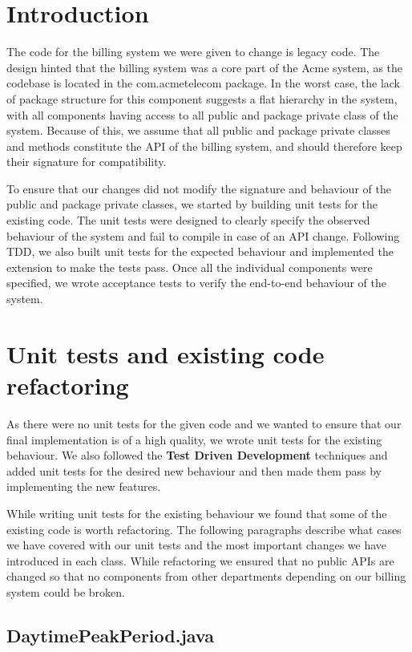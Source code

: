 \documentclass[a4paper]{article}
\begin{document}
\section{Introduction}
The code for the billing system we were given to change is legacy code. The design hinted that the billing system was a core part of the Acme system, as the codebase is located in the com.acmetelecom package. In the worst case, the lack of package structure for this component suggests a flat hierarchy in the system, with all components having access to all public and package private class of the system. Because of this, we assume that all public and package private classes and methods constitute the API of the billing system, and should therefore keep their signature for compatibility.

To ensure that our changes did not modify the signature and behaviour of the public and package private classes, we started by building unit tests for the existing code. The unit tests were designed to clearly specify the observed behaviour of the system and fail to compile in case of an API change. Following TDD, we also built unit tests for the expected behaviour and implemented the extension to make the tests pass. Once all the individual components were specified, we wrote acceptance tests to verify the end-to-end behaviour of the system.


\section{Unit tests and existing code refactoring}
As there were no unit tests for the given code and we wanted to ensure that our final implementation is of a high quality, we wrote unit tests for the existing behaviour. We also followed the {\bf Test Driven Development} techniques and added unit tests for the desired new behaviour and then made them pass by implementing the new features.

While writing unit tests for the existing behaviour we found that some of the existing code is worth refactoring. The following paragraphs describe what cases we have covered with our unit tests and the most important changes we have introduced in each class. While refactoring we ensured that no public APIs are changed so that no components from other departments depending on our billing system could be broken.

\subsection{DaytimePeakPeriod.java}
\end{document}
